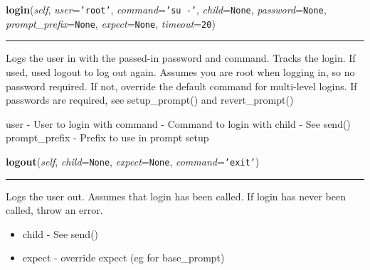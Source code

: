 \hspace{.8\funcindent}\begin{boxedminipage}{\funcwidth}

    \raggedright \textbf{login}(\textit{self}, \textit{user}={\tt \texttt{'}\texttt{root}\texttt{'}}, \textit{command}={\tt \texttt{'}\texttt{su -}\texttt{'}}, \textit{child}={\tt None}, \textit{password}={\tt None}, \textit{prompt\_prefix}={\tt None}, \textit{expect}={\tt None}, \textit{timeout}={\tt 20})

    \vspace{-1.5ex}

    \rule{\textwidth}{0.5\fboxrule}
\setlength{\parskip}{2ex}
    Logs the user in with the passed-in password and command. Tracks the 
    login. If used, used logout to log out again. Assumes you are root when
    logging in, so no password required. If not, override the default 
    command for multi-level logins. If passwords are required, see 
    setup\_prompt() and revert\_prompt()

    user      - User to login with command   - Command to login with child
    - See send() prompt\_prefix - Prefix to use in prompt setup

\setlength{\parskip}{1ex}
    \end{boxedminipage}

    \label{shutit_global:ShutIt:logout}

    \vspace{0.5ex}

\hspace{.8\funcindent}\begin{boxedminipage}{\funcwidth}

    \raggedright \textbf{logout}(\textit{self}, \textit{child}={\tt None}, \textit{expect}={\tt None}, \textit{command}={\tt \texttt{'}\texttt{exit}\texttt{'}})

    \vspace{-1.5ex}

    \rule{\textwidth}{0.5\fboxrule}
\setlength{\parskip}{2ex}
    Logs the user out. Assumes that login has been called. If login has 
    never been called, throw an error.

    \begin{itemize}
    \setlength{\parskip}{0.6ex}
      \item child              - See send()

      \item expect             - override expect (eg for base\_prompt)

    \end{itemize}

\setlength{\parskip}{1ex}
    \end{boxedminipage}

